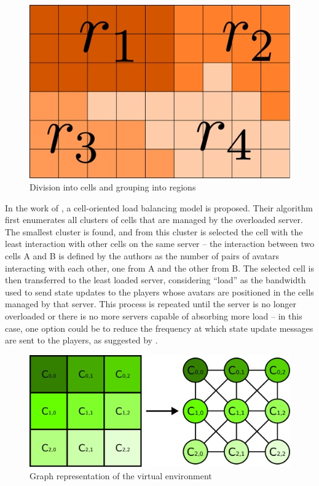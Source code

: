 \documentclass[acmjacm]{acmtrans2m}
\begin{document}
\begin{figure}[!t]
	\centering
	\includegraphics[width=0.4\linewidth]{images/macromicro}
	\caption{Division into cells and grouping into regions}
	\label{fig:cells}
\end{figure}

In the work of \cite{ahmed2008mol}, a cell-oriented load balancing model is proposed. Their algorithm first enumerates all clusters of cells that are managed by the overloaded server. The smallest cluster is found, and from this cluster is selected the cell with the least interaction with other cells on the same server -- the interaction between two cells A and B is defined by the authors as the number of pairs of avatars interacting with each other, one from A and the other from B. The selected cell is then transferred to the least loaded server, considering ``load'' as the bandwidth used to send state updates to the players whose avatars are positioned in the cells managed by that server. This process is repeated until the server is no longer overloaded or there is no more servers capable of absorbing more load -- in this case, one option could be to reduce the frequency at which state update messages are sent to the players, as suggested by \cite{bezerra2008a3}.

\begin{figure}[!t]
	\centering
	\includegraphics[width=0.7\linewidth]{images/grafo}
	\caption{Graph representation of the virtual environment}
	\label{fig:graph}
\end{figure}
\end{document}
